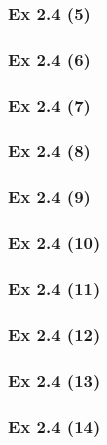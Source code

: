 \subsubsection{Ex 2.4 (5)}\label{sec:Ex_2.4.5}

\subsubsection{Ex 2.4 (6)}\label{sec:Ex_2.4.6}

\subsubsection{Ex 2.4 (7)}\label{sec:Ex_2.4.7}

\subsubsection{Ex 2.4 (8)}\label{sec:Ex_2.4.8}

\subsubsection{Ex 2.4 (9)}\label{sec:Ex_2.4.9}

\subsubsection{Ex 2.4 (10)}\label{sec:Ex_2.4.10}

\newpage		%


\subsubsection{Ex 2.4 (11)}\label{sec:Ex_2.4.11}

\subsubsection{Ex 2.4 (12)}\label{sec:Ex_2.4.12}

\subsubsection{Ex 2.4 (13)}\label{sec:Ex_2.4.13}

\subsubsection{Ex 2.4 (14)}\label{sec:Ex_2.4.14}

